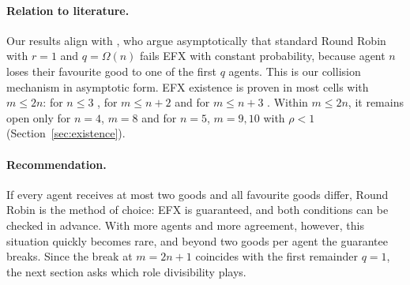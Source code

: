 \paragraph{Relation to literature.}
Our results align with \textcite[p.~17]{manurangsi2021}, who argue asymptotically that standard Round Robin with $r=1$ and $q=\Omega(n)$ fails EFX with constant probability, because agent $n$ loses their favourite good to one of the first $q$ agents. This is our collision mechanism in asymptotic form. EFX existence is proven in most cells with $m\leq2n$: for $n\leq3$ \parencite{plaut2020,chaudhury2024}, for $m\leq n+2$ \parencite{amanatidis2020multiple} and for $m\leq n+3$ \parencite{mahara2024general}. Within $m\leq2n$, it remains open only for $n=4$, $m=8$ and for $n=5$, $m=9,10$ with $\rho<1$ (Section~\ref{sec:existence}).

\paragraph{Recommendation.}
If every agent receives at most two goods and all favourite goods differ, Round Robin is the method of choice: EFX is guaranteed, and both conditions can be checked in advance. With more agents and more agreement, however, this situation quickly becomes rare, and beyond two goods per agent the guarantee breaks. Since the break at $m=2n+1$ coincides with the first remainder $q=1$, the next section asks which role divisibility plays.
